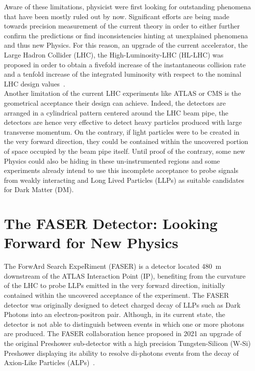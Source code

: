 Aware of these limitations, physicist were first looking for outstanding phenomena that have been mostly ruled out by now. Significant efforts are being made towards precision measurement of the current theory in order to either further confirm the predictions or find inconsistencies hinting at unexplained phenomena and thus new Physics. For this reason, an upgrade of the current accelerator, the Large Hadron Collider (LHC), the High-Luminosity-LHC (HL-LHC) was proposed in order to obtain a fivefold increase of the instantaneous collision rate and a tenfold increase of the integrated luminosity with respect to the nominal LHC design values\ \cite{HL_LHC_report}.\\

Another limitation of the current LHC experiments like ATLAS or CMS is the geometrical acceptance their design can achieve. Indeed, the detectors are arranged in a cylindrical pattern centered around the LHC beam pipe, the detectors are hence very effective to detect heavy particles produced with large transverse momentum. On the contrary, if light particles were to be created in the very forward direction, they could be contained within the uncovered portion of space occupied by the beam pipe itself. Until proof of the contrary, some new Physics could also be hiding in these un-instrumented regions and some experiments already intend to use this incomplete acceptance to probe signals from weakly interacting and Long Lived Particles (LLPs) as suitable candidates for Dark Matter (DM).    
\clearpage 

\section{The FASER Detector: Looking Forward for New Physics}
The ForwArd Search ExpeRiment (FASER) is a detector located \SI{480}{\meter} downstream of the ATLAS Interaction Point (IP), benefiting from the curvature of the LHC to probe LLPs emitted in the very forward direction, initially contained within the uncovered acceptance of the experiment. 
The FASER detector was originally designed to detect charged decay of LLPs such as Dark Photons into an electron-positron pair. Although, in its current state, the detector is not able to distinguish between events in which one or more photons are produced. The FASER collaboration hence proposed in 2021 an upgrade of the original Preshower sub-detector with a high precision Tungsten-Silicon (W-Si) Preshower displaying its ability to resolve di-photons events from the decay of Axion-Like Particles (ALPs)\ \cite{PreShower_TP}. \\

